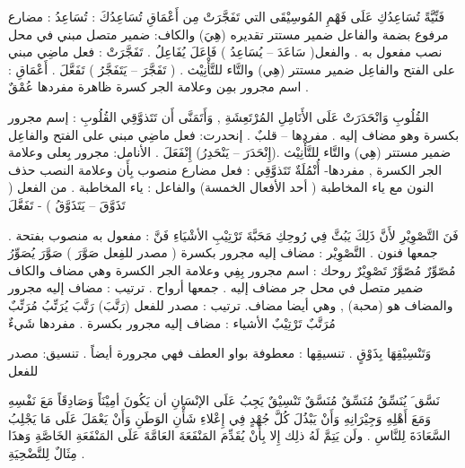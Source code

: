 \documentclass[a4paper]{article}
\begin{document}
\begin{flushright}
فَنِّيَّةً تُسَاعِدُكِ عَلَى فَهْمِ المُوسِيْقَى التي تَفَجَّرَتْ مِن أَعْمَاقِ
تُسَاعِدُكَ : تُسَاعِدُ : مضارع مرفوع بضمة والفاعل ضمير مستتر تقديره (هِيَ) والكاف: ضمير متصل مبني في محل نصب مفعول به . والفعل( سَاعَدَ – يُسَاعِدُ ) فَاعَلَ يُفَاعِلُ .
تَفَجَّرَتْ : فعل ماضِي مبني على الفتح  والفاعِل ضمير مستتر (هِي)
            والتَّاء للتَّأْنِيْث . ( تَفَجَّرَ – يَتَفَجَّرُ ) تَفَعَّلَ .
أَعْمَاقِ : اسم مجرور بمِن وعلامة الجر كسرة ظاهرة
          مفردها عُمْقٌ .

القُلُوبِ وَانْحَدَرَتْ عَلَى الأَنَامِلِ المُرْتَعِشَةِ , وَأَتَمَنَّى أَن تَتَذوَّقِي
القُلُوبِ : إسم مجرور بكسرة وهو مضاف إليه . مفردها – قلبٌ .
إنحدرت: فعل ماضِي مبني على الفتح  والفاعِل ضمير مستتر (هِي)
            والتَّاء للتَّأْنِيْث .(إِنْحَدَرَ – يَنْحَدِرُ) إِنْفَعَلَ .
الأنامل: مجرور بِعلى وعلامة الجر الكسرة , مفردها- أُنْمُلَةٌ
تَتَذوَّقِي : فعل مضارع منصوب بِأَن وعلامة النصب حذف النون مع ياء
      المخاطبة ( أحد الأفعال الخمسة) والفاعل : ياء المخاطبة .
      من الفعل ( تَذَوَّقَ – يَتَذَوَّقُ ) - تَفَعَّلَ

فَنَ التَّصْوِيْرِ لأَنَّ ذَلِكَ يَبُثَّ فِي رُوحِكِ مَحَبَّةَ تَرْتِيْبِ الأشْيَاءِ
فَنَّ : مفعول به منصوب بفتحة . جمعها فنون .
التَّصْوِيْر : مضاف إليه مجرور بكسرة ( مصدر للفِعل صَوَّرَ )
      صَوَّرَ  يُصَوِّرُ  مُصّوِّرٌ  مُصّوَّرٌ  تَصْوِيْرٌ
روحك : اسم مجرور بِفِي وعلامة الجر الكسرة وهي مضاف والكاف
      ضمير متصل في محل جر مضاف إليه . جمعها أرواح .
ترتيب : مضاف إليه مجرور والمضاف هو (محبة) , وهي أيضا مضاف.
      ترتيب : مصدر للفعل (رَتَّبَ) رَتَّبَ يُرَتِّبُ مُرَتِّبٌ مُرَتَّبٌ تَرْتِيْبٌ
الأشياء : مضاف إليه مجرور بكسرة . مفردها شَيءٌ

وَتَنْسِيْقِهَا بِذَوْقٍ .
تنسيقِها : معطوفة بواو العطف فهي مجرورة أيضاً . تنسيق: مصدر للفعل

          نَسَّق َ يُنَسِّقُ  مُنَسِّقٌ  مُنَسَّقٌ  تَنْسِيْقٌ
يَجِبُ عَلَى الإنْسَانِ أن يَكُونَ أمِيْنَاً وَصَادِقَاً مَعَ نَفْسِهِ وَمَعَ أَهْلِهِ وَجِيْرَانِهِ وَأَنْ يَبْذُلَ كُلَّ جُهْدٍ فِي إِعْلاءِ شَأْنِ الوَطَنِ وَأَنْ يَعْمَلَ عَلَى مَا يَجْلِبُ السَّعَادَةَ لِلنَّاسِ . ولَن يَتِمَّ لَهُ ذلِك إِلا بِأَنْ يُقَدِّمَ المَنْفَعَةَ العَامَّةَ عَلَى المَنْفَعَةِ الخَاصَّةِ وَهذَا مِثَالٌ لِلتَّضْحِيَةِ .



\end{flushright}
\end{document}
